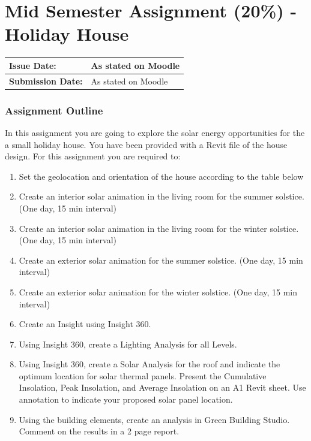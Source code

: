 
	
\part*{Mid Semester Assignment (20\%) - Holiday House}

\begin{tabularx}{\textwidth}{ |X|X| }
	\hline
	\textbf{Issue Date:} & As stated on Moodle \\
	\hline 
	\textbf{Submission Date:}  & As stated on Moodle  \\
	\hline
\end{tabularx}


\section*{Assignment Outline}


In this assignment you are going to explore the solar energy opportunities for
the a small holiday house. You have been provided with a Revit file of the
house design. For this assignment you are required to:



\begin{enumerate}

	\item Set the geolocation and orientation of the house according to the table below
	\item Create an interior solar animation in the living room for the summer solstice. (One day, 15 min interval)
	\item Create an interior solar animation in the living room for the winter solstice. (One day, 15 min interval)
	\item Create an exterior solar animation for the summer solstice. (One day, 15 min interval)
	\item Create an exterior solar animation for the winter solstice. (One day, 15 min interval)
	\item Create an Insight using Insight 360.
	\item Using Insight 360, create a Lighting Analysis for all Levels.
	\item Using Insight 360, create a Solar Analysis for the roof and indicate the optimum location for solar thermal panels. Present the Cumulative Insolation, Peak Insolation, and Average Insolation on an A1 Revit sheet. Use 	annotation to indicate your proposed solar panel location.
	\item Using the building elements, create an analysis in Green Building Studio. Comment on the results in a 2 page report.
\end{enumerate}




